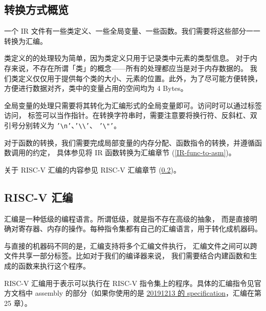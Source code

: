 \subsection{转换方式概览}

一个 IR 文件有一些类定义、一些全局变量、一些函数。我们需要将这些部分一一转换为汇编。

类定义的的处理较为简单，因为类定义只用于记录类中元素的类型信息。
对于内存来说，不存在所谓「类」的概念——所有的处理都应当是对于内存数据的。
我们类定义仅仅用于提供每个类的大小、元素的位置。此外，为了尽可能方便转换，
方便进行数据对齐，类中的变量占用的空间均为 4 Bytes。

全局变量的处理只需要将其转化为汇编形式的全局变量即可。访问时可以通过标签访问，
标签可以当作指针。在转换字符串时，需要注意要将换行符、反斜杠、双引号分别转义为
\texttt{'\textbackslash{}n'}、\texttt{'\textbackslash\textbackslash'}、
\texttt{'\textbackslash"'}。

对于函数的转换，我们需要完成局部变量的内存分配、函数指令的转换，并遵循函数调用的约定，
具体参见将 IR 函数转换为汇编章节 (\ref{IR-func-to-asm})。

关于 RISC-V 汇编的内容参见 RISC-V 汇编章节 (\ref{RV-asm-intro})。

\subsection{RISC-V 汇编}\label{RV-asm-intro}

汇编是一种低级的编程语言。所谓低级，就是指不存在高级的抽象，
而是直接明确对寄存器、内存的操作。每种指令集都有自己的汇编语言，用于转化成机器码。

与直接的机器码不同的是，汇编支持将多个汇编文件执行，
汇编文件之间可以跨文件共享一部分标签。比如对于我们的编译器来说，
我们需要结合内建函数和生成的函数来执行这个程序。

RISC-V 汇编用于表示可以执行在 RISC-V 指令集上的程序。具体的汇编指令见官方文档中
assembly 的部分（如果你使用的是
\href{https://riscv.org/wp-content/uploads/2019/12/riscv-spec-20191213.pdf}{20191213
的 specification}，汇编在第 25 章）。

